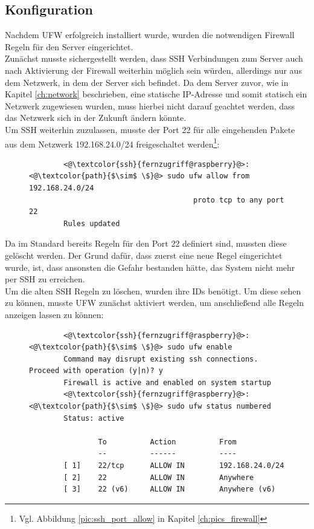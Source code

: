 \documentclass[a4paper, 11pt]{scrartcl}
\begin{document}
\subsection{Konfiguration}\label{ch:firewall_config}
Nachdem UFW erfolgreich installiert wurde, wurden die notwendigen Firewall Regeln für den Server eingerichtet.
\\
Zunächst musste sichergestellt werden, dass SSH Verbindungen zum Server auch nach Aktivierung der Firewall weiterhin möglich sein würden, allerdings nur aus dem Netzwerk, in dem der
Server sich befindet. Da dem Server zuvor, wie in Kapitel \ref{ch:network} beschrieben, eine statische IP-Adresse und somit statisch ein Netzwerk zugewiesen wurden, muss hierbei
nicht darauf geachtet werden, dass das Netzwerk sich in der Zukunft ändern könnte.
\\
Um SSH weiterhin zuzulassen, musste der Port 22 für alle eingehenden Pakete aus dem Netzwerk 192.168.24.0/24 freigeschaltet
werden\footnote{Vgl. Abbildung \ref{pic:ssh_port_allow} in Kapitel \ref{ch:pics_firewall}}:
\begin{figure}[H]
    \begin{mdframed}[backgroundcolor=bbg]
        \begin{lstlisting}
        <@\textcolor{ssh}{fernzugriff@raspberry}@>:<@\textcolor{path}{$\sim$ \$}@> sudo ufw allow from 192.168.24.0/24 
                                      proto tcp to any port 22
        Rules updated
        \end{lstlisting}
    \end{mdframed}
    \label{lst:allow_ssh_from_network}
\end{figure}
Da im Standard bereits Regeln für den Port 22 definiert sind, mussten diese gelöscht werden. Der Grund dafür, dass zuerst eine neue Regel eingerichtet wurde, ist,
dass ansonsten die Gefahr bestanden hätte, das System nicht mehr per SSH zu erreichen.
\\
Um die alten SSH Regeln zu löschen, wurden ihre IDs benötigt. Um diese sehen zu können, musste UFW zunächst aktiviert werden, um anschließend alle Regeln anzeigen lassen
zu können:
\begin{figure}[H]
    \begin{mdframed}[backgroundcolor=bbg]
        \begin{lstlisting}
        <@\textcolor{ssh}{fernzugriff@raspberry}@>:<@\textcolor{path}{$\sim$ \$}@> sudo ufw enable
        Command may disrupt existing ssh connections. Proceed with operation (y|n)? y
        Firewall is active and enabled on system startup
        <@\textcolor{ssh}{fernzugriff@raspberry}@>:<@\textcolor{path}{$\sim$ \$}@> sudo ufw status numbered
        Status: active

                To          Action          From
                --          ------          ----
        [ 1]    22/tcp      ALLOW IN        192.168.24.0/24
        [ 2]    22          ALLOW IN        Anywhere
        [ 3]    22 (v6)     ALLOW IN        Anywhere (v6)
        \end{lstlisting}
    \end{mdframed}
    \label{lst:ufw_enable_status}
\end{figure}
\end{document}

